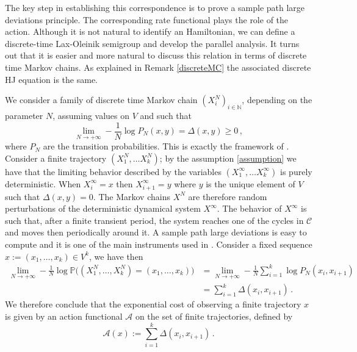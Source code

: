 \documentclass[reqno]{amsart}
\theoremstyle{plain}
\theoremstyle{definition}
\theoremstyle{remark}
\numberwithin{equation}{section}
\numberwithin{theorem}{section}
\newcommand{\<}{\langle}
\renewcommand{\>}{\rangle}
\begin{document}
The key step in establishing this correspondence is to prove a sample path large deviations principle. The corresponding rate functional plays the role of the action. Although it is not natural to identify an Hamiltonian, we can define a discrete-time Lax-Oleinik semigroup and develop the parallel analysis. It turns out that it is easier and more natural to discuss this relation in terms of discrete time Markov chains. As explained in Remark \ref{discreteMC} the associated discrete HJ equation is the same.

\smallskip

We consider a family of discrete time Markov chain $\left(X^N_i\right)_{i\in \mathbb N}$, depending on the parameter $N$, assuming values on $V$ and such that
$$
\lim_{N\to+\infty}-\frac{1}{N}\log P_N(x,y)=\Delta(x,y)\geq 0\,,
$$
where $P_N$ are the transition probabilities. This is exactly the framework of \cite{OS1, OS2, S1, S2, S3}. Consider a finite trajectory $\left(X^N_1, \dots X^N_k\right)$; by the assumption \eqref{assumption} we have that the limiting behavior described by the variables $\left(X^\infty_1, \dots X^\infty_k\right)$ is purely deterministic. When $X^\infty_i=x$ then $X^\infty_{i+1}=y$ where $y$ is the unique element of $V$ such that $\Delta(x,y)=0$. The Markov chains $X^N$ are therefore random perturbations of the deterministic dynamical system $X^\infty$. The behavior of $X^\infty$ is such that, after a finite transient period, the system reaches one of the cycles in $\mathcal C$ and moves then periodically around it. A sample path large deviations is easy to compute and it is one of the main instruments used in \cite{OS1, OS2, S1, S2, S3}. Consider a fixed sequence $x:=\left(x_1,\dots ,x_k\right)\in V^k$, we have then
\begin{align*}
	\lim_{N\to +\infty}-\frac{1}{N}\log \mathbb P\Big((X_1^N, \dots ,X^N_k)=(x_1,\dots ,x_k)\Big) 
	&=\lim_{N\to +\infty}-\frac 1N \sum_{i=1}^k \log P_N(x_i,x_{i+1})\\
	&=\sum_{i=1}^k \Delta(x_i, x_{i+1})\,.
\end{align*}
We therefore conclude that the exponential cost of observing a finite trajectory $x$ is given by an action functional $\mathcal A$ on the set of finite trajectories, defined by
\begin{equation}\label{lagrangiana}
	\mathcal A(x):=\sum_{i=1}^k \Delta(x_i,x_{i+1})\,.
\end{equation}
\end{document}
